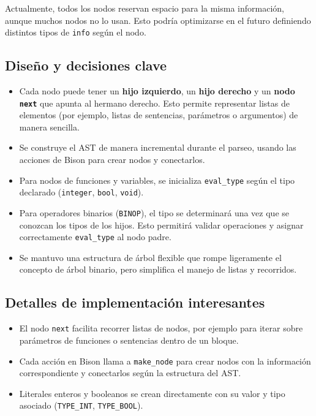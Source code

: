 \documentclass[12pt,a4paper]{article}
\begin{document}
Actualmente, todos los nodos reservan espacio para la misma información, aunque muchos nodos no lo usan. Esto podría optimizarse en el futuro definiendo distintos tipos de \texttt{info} según el nodo.

\subsection{Diseño y decisiones clave}
\begin{itemize}
    \item Cada nodo puede tener un \textbf{hijo izquierdo}, un \textbf{hijo derecho} y un \textbf{nodo \texttt{next}} que apunta al hermano derecho. Esto permite representar listas de elementos (por ejemplo, listas de sentencias, parámetros o argumentos) de manera sencilla.
    \item Se construye el AST de manera incremental durante el parseo, usando las acciones de Bison para crear nodos y conectarlos.
    \item Para nodos de funciones y variables, se inicializa \texttt{eval\_type} según el tipo declarado (\texttt{integer}, \texttt{bool}, \texttt{void}).
    \item Para operadores binarios (\texttt{BINOP}), el tipo se determinará una vez que se conozcan los tipos de los hijos. Esto permitirá validar operaciones y asignar correctamente \texttt{eval\_type} al nodo padre.
    \item Se mantuvo una estructura de árbol flexible que rompe ligeramente el concepto de árbol binario, pero simplifica el manejo de listas y recorridos.
\end{itemize}

\subsection{Detalles de implementación interesantes}
\begin{itemize}
    \item El nodo \texttt{next} facilita recorrer listas de nodos, por ejemplo para iterar sobre parámetros de funciones o sentencias dentro de un bloque.
    \item Cada acción en Bison llama a \texttt{make\_node} para crear nodos con la información correspondiente y conectarlos según la estructura del AST.
    \item Literales enteros y booleanos se crean directamente con su valor y tipo asociado (\texttt{TYPE\_INT}, \texttt{TYPE\_BOOL}).
\end{itemize}
\end{document}
